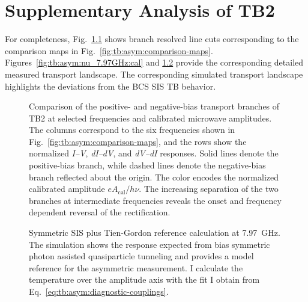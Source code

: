 \chapter{Supplementary Analysis of TB2}
\label{appendix:tb2}

    For completeness, Fig.~\ref{fig:tb:asym:comparison-cuts} shows branch resolved line cuts corresponding to the comparison maps in Fig.~\ref{fig:tb:asym:comparison-maps}. Figures~\ref{fig:tb:asym:nu_7.97GHz:cal} and \ref{fig:tb:asym:nu_7.97GHz:sim} provide the corresponding detailed measured transport landscape. The corresponding simulated transport landscape highlights the deviations from the BCS SIS TB behavior.

    \begin{figure}[h]
        \centering
        \caption{
            Comparison of the positive- and negative-bias transport branches of TB2 at selected frequencies and calibrated microwave amplitudes. The columns correspond to the six frequencies shown in Fig.~\ref{fig:tb:asym:comparison-maps}, and the rows show the normalized \textit{I--V}, \textit{dI--dV}, and \textit{dV--dI} responses. Solid lines denote the positive-bias branch, while dashed lines denote the negative-bias branch reflected about the origin. The color encodes the normalized calibrated amplitude $eA_\mathrm{cal}/h\nu$. The increasing separation of the two branches at intermediate frequencies reveals the onset and frequency dependent reversal of the rectification.
        }
        \label{fig:tb:asym:comparison-cuts}
    \end{figure}


    \begin{figure}[p]
        \centering
        \caption{
            Calibrated transport landscape of TB2 at \qty{7.97}{\giga\hertz}. The three columns show the \textit{I--V}, \textit{dI--dV}, and \textit{dV--dI} responses as selected traces, surfaces, and false-color maps. The vertical axis uses the effective calibrated amplitude defined in Eq.~\eqref{eq:tb:asym:amplitude-coupling}.
            }
        \label{fig:tb:asym:nu_7.97GHz:cal}

        \vspace{1em}

        \caption{
            Symmetric SIS plus Tien-Gordon reference calculation at \qty{7.97}{\giga\hertz}. The simulation shows the response expected from bias symmetric photon assisted quasiparticle tunneling and provides a model reference for the asymmetric measurement. I calculate the temperature over the amplitude axis with the fit I obtain from Eq.~\eqref{eq:tb:asym:diagnostic-couplings}.
            }
        \label{fig:tb:asym:nu_7.97GHz:sim}
    \end{figure}


